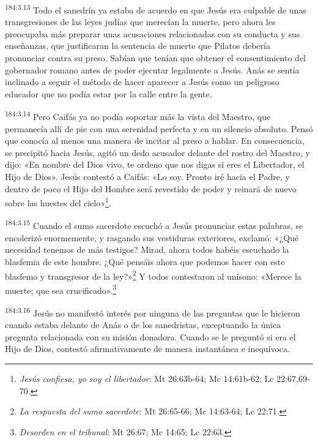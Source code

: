 \par 
\textsuperscript{184:3.13} Todo el sanedrín ya estaba de acuerdo en que Jesús era culpable de unas transgresiones de las leyes judías que merecían la muerte, pero ahora les preocupaba más preparar unas acusaciones relacionadas con su conducta y sus enseñanzas, que justificaran la sentencia de muerte que Pilatos debería pronunciar contra su preso. Sabían que tenían que obtener el consentimiento del gobernador romano antes de poder ejecutar legalmente a Jesús. Anás se sentía inclinado a seguir el método de hacer aparecer a Jesús como un peligroso educador que no podía estar por la calle entre la gente.

\par 
\textsuperscript{184:3.14} Pero Caifás ya no podía soportar más la vista del Maestro, que permanecía allí de pie con una serenidad perfecta y en un silencio absoluto. Pensó que conocía al menos una manera de incitar al preso a hablar. En consecuencia, se precipitó hacia Jesús, agitó un dedo acusador delante del rostro del Maestro, y dijo: «En nombre del Dios vivo, te ordeno que nos digas si eres el Libertador, el Hijo de Dios». Jesús contestó a Caifás: «Lo soy. Pronto iré hacia el Padre, y dentro de poco el Hijo del Hombre será revestido de poder y reinará de nuevo sobre las huestes del cielo»\footnote{\textit{Jesús confiesa, yo soy el libertador}: Mt 26:63b-64; Mc 14:61b-62; Lc 22:67,69-70.}.

\par 
\textsuperscript{184:3.15} Cuando el sumo sacerdote escuchó a Jesús pronunciar estas palabras, se encolerizó enormemente, y rasgando sus vestiduras exteriores, exclamó: «¿Qué necesidad tenemos de más testigos? Mirad, ahora todos habéis escuchado la blasfemia de este hombre. ¿Qué pensáis ahora que podemos hacer con este blasfemo y transgresor de la ley?»\footnote{\textit{La respuesta del sumo sacerdote}: Mt 26:65-66; Mc 14:63-64; Lc 22:71.} Y todos contestaron al unísono: «Merece la muerte; que sea crucificado».\footnote{\textit{Desorden en el tribunal}: Mt 26:67; Mc 14:65; Lc 22:63.}

\par 
\textsuperscript{184:3.16} Jesús no manifestó interés por ninguna de las preguntas que le hicieron cuando estaba delante de Anás o de los sanedristas, exceptuando la única pregunta relacionada con su misión donadora. Cuando se le preguntó si era el Hijo de Dios, contestó afirmativamente de manera instantánea e inequívoca.

